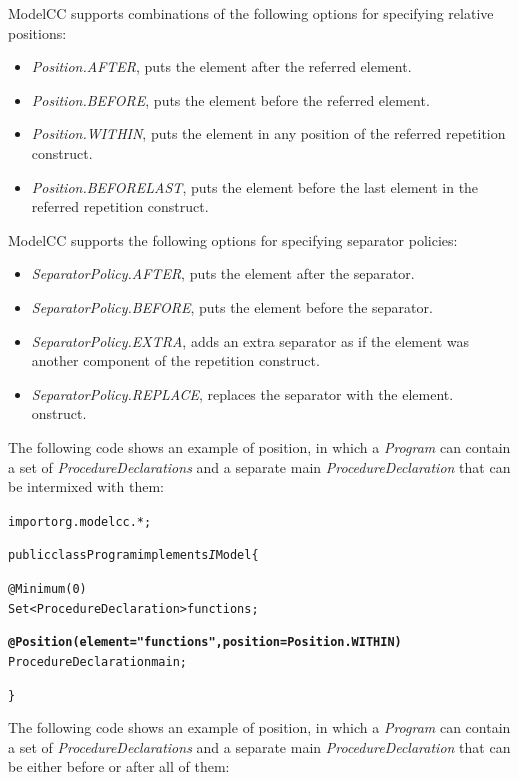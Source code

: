 \documentclass[a4paper,twoside,onecolumn]{article}
\newenvironment{colframe}{%
  \begin{Sbox} 
    \begin{minipage}{.8\columnwidth} 
}{%

  \end{minipage} 
  \end{Sbox} 
  \begin{center} 
    \fcolorbox{black}{MyGray}{\TheSbox} 
  \end{center} 
}
\newcommand{\an}[1]{\emph{#1}} %
\begin{document}
ModelCC supports combinations of the following options for specifying relative positions:
%
\begin{itemize}
\item \an{Position.AFTER}, puts the element after the referred element.
\item \an{Position.BEFORE}, puts the element before the referred element.
\item \an{Position.WITHIN}, puts the element in any position of the referred repetition construct.
\item \an{Position.BEFORELAST}, puts the element before the last element in the referred repetition construct.
\end{itemize}

ModelCC supports the following options for specifying separator policies:

\begin{itemize}
\item \an{SeparatorPolicy.AFTER}, puts the element after the separator.
\item \an{SeparatorPolicy.BEFORE}, puts the element before the separator.
\item \an{SeparatorPolicy.EXTRA}, adds an extra separator as if the element was another component of the repetition construct.
\item \an{SeparatorPolicy.REPLACE}, replaces the separator with the element.
onstruct.
\end{itemize}

The following code shows an example of position, in which a \emph{Program} can contain a set of \emph{ProcedureDeclarations} and a separate main \emph{ProcedureDeclaration} that can be intermixed with them:

\begin{colframe}
\begin{alltt}
import org.modelcc.*;

public class Program implements{\emph IModel} \{

  @Minimum(0)
  Set<ProcedureDeclaration> functions;

  {\bf @Position(element="functions",position=Position.WITHIN)}
  ProcedureDeclaration main;

\}
\end{alltt}
\end{colframe}

The following code shows an example of position, in which a \emph{Program} can contain a set of \emph{ProcedureDeclarations} and a separate main \emph{ProcedureDeclaration} that can be either before or after all of them:
\end{document}
